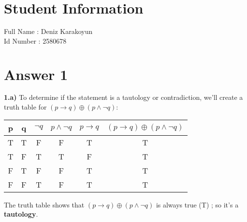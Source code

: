 \documentclass[12pt]{article}
\begin{document}
\section*{Student Information } 
Full Name :  Deniz Karakoyun  \\ 
Id Number :  2580678 \\ 

\section*{Answer 1}

\textbf{1.a)} To determine if the statement is a tautology or contradiction, we'll create a truth table for $(p \to q) \oplus (p \land \neg q)$:

\begin{table}[H]
\centering
\begin{tabular}{|c|c|c|c|c|c|}
\hline
p & q & $\neg q$ & $p \land \neg q$ & $p \to q$ & $(p \to q) \oplus (p \land \neg q)$ \\
\hline
T & T & F & F & T & T \\
T & F & T & T & F & T \\
F & T & F & F & T & T \\
F & F & T & F & T & T \\
\hline
\end{tabular}
\end{table}

The truth table shows that $(p \to q) \oplus (p \land \neg q)$ is always true (T) ; so it's a \textbf{tautology}.\\
\end{document}
